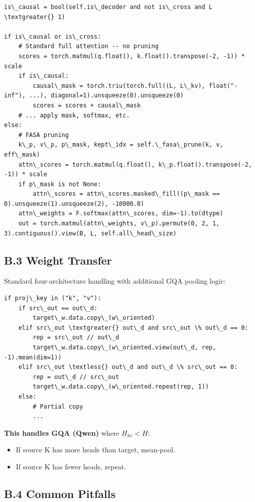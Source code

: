 \begin{lstlisting}
is\_causal = bool(self.is\_decoder and not is\_cross and L \textgreater{} 1)

if is\_causal or is\_cross:
    # Standard full attention -- no pruning
    scores = torch.matmul(q.float(), k.float().transpose(-2, -1)) * scale
    if is\_causal:
        causal\_mask = torch.triu(torch.full((L, L\_kv), float("-inf"), ...), diagonal=1).unsqueeze(0).unsqueeze(0)
        scores = scores + causal\_mask
    # ... apply mask, softmax, etc.
else:
    # FASA pruning
    k\_p, v\_p, p\_mask, kept\_idx = self.\_fasa\_prune(k, v, eff\_mask)
    attn\_scores = torch.matmul(q.float(), k\_p.float().transpose(-2, -1)) * scale
    if p\_mask is not None:
        attn\_scores = attn\_scores.masked\_fill((p\_mask == 0).unsqueeze(1).unsqueeze(2), -10000.0)
    attn\_weights = F.softmax(attn\_scores, dim=-1).to(dtype)
    out = torch.matmul(attn\_weights, v\_p).permute(0, 2, 1, 3).contiguous().view(B, L, self.all\_head\_size)
\end{lstlisting}

\subsection{B.3 Weight Transfer}

Standard four-architecture handling with additional GQA pooling logic:

\begin{lstlisting}
if proj\_key in ("k", "v"):
    if src\_out == out\_d:
        target\_w.data.copy\_(w\_oriented)
    elif src\_out \textgreater{} out\_d and src\_out \% out\_d == 0:
        rep = src\_out // out\_d
        target\_w.data.copy\_(w\_oriented.view(out\_d, rep, -1).mean(dim=1))
    elif src\_out \textless{} out\_d and out\_d \% src\_out == 0:
        rep = out\_d // src\_out
        target\_w.data.copy\_(w\_oriented.repeat(rep, 1))
    else:
        # Partial copy
        ...
\end{lstlisting}

\textbf{This handles GQA (Qwen)} where $H_{kv} < H$:
\begin{itemize}
\item If source K has more heads than target, mean-pool.
\item If source K has fewer heads, repeat.

\end{itemize}
\subsection{B.4 Common Pitfalls}

